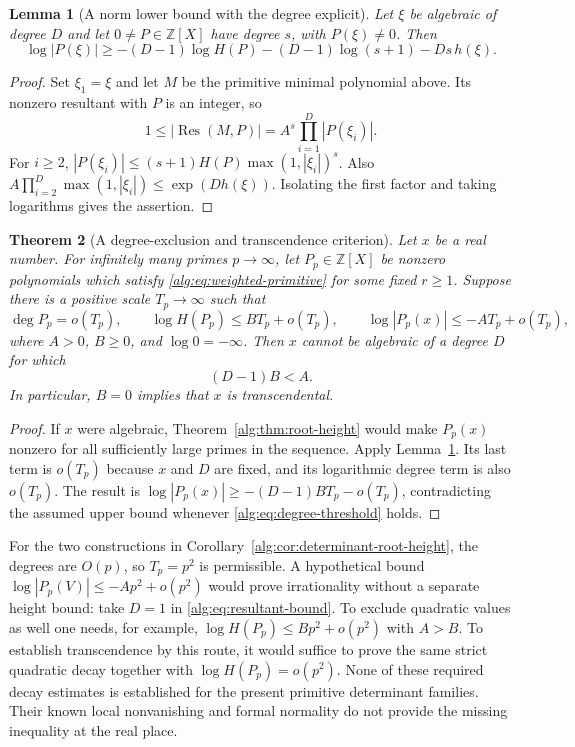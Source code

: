 \documentclass[11pt,a4paper]{article}
\numberwithin{equation}{section}
\newtheorem{theorem}{Theorem}[section]
\newtheorem{lemma}[theorem]{Lemma}
\theoremstyle{definition}\newtheorem{definition}[theorem]{Definition}
\theoremstyle{remark}\newtheorem{remark}[theorem]{Remark}
\begin{document}
\begin{lemma}[A norm lower bound with the degree explicit]
\label{alg:lem:algebraic-evaluation}
Let $\xi$ be algebraic of degree $D$ and let
$0\ne P\in\mathbb Z[X]$ have degree $s$, with $P(\xi)\ne0$. Then
\begin{equation}\label{alg:eq:resultant-bound}
 \log|P(\xi)|\ge -(D-1)\log H(P)
 -(D-1)\log(s+1)-Ds\,h(\xi).
\end{equation}
\end{lemma}
\begin{proof}
Set $\xi_1=\xi$ and let $M$ be the primitive minimal polynomial above.
Its nonzero resultant with $P$ is an integer, so
\[
 1\le |\operatorname{Res}(M,P)|
   =A^s\prod_{i=1}^D|P(\xi_i)|.
\]
For $i\ge2$,
$|P(\xi_i)|\le(s+1)H(P)\max(1,|\xi_i|)^s$.
Also
$A\prod_{i=2}^D\max(1,|\xi_i|)\le\exp(Dh(\xi))$.
Isolating the first factor and taking logarithms gives the assertion.
\end{proof}

\begin{theorem}[A degree-exclusion and transcendence criterion]
\label{alg:thm:degree-exclusion}
Let $x$ be a real number. For infinitely many primes $p\to\infty$, let
$P_p\in\mathbb Z[X]$ be nonzero polynomials which satisfy
\eqref{alg:eq:weighted-primitive} for some fixed $r\ge1$.
Suppose there is a positive scale $T_p\to\infty$ such that
\[
 \deg P_p=o(T_p),\qquad
 \log H(P_p)\le B T_p+o(T_p),\qquad
 \log|P_p(x)|\le-A T_p+o(T_p),
\]
where $A>0$, $B\ge0$, and $\log0=-\infty$.
Then $x$ cannot be algebraic of a degree $D$ for which
\begin{equation}\label{alg:eq:degree-threshold}
 (D-1)B<A.
\end{equation}
In particular, $B=0$ implies that $x$ is transcendental.
\end{theorem}
\begin{proof}
If $x$ were algebraic, Theorem~\ref{alg:thm:root-height} would make $P_p(x)$
nonzero for all sufficiently large primes in the sequence. Apply
Lemma~\ref{alg:lem:algebraic-evaluation}. Its last term is $o(T_p)$ because
$x$ and $D$ are fixed, and its logarithmic degree term is also $o(T_p)$.
The result is
$\log|P_p(x)|\ge-(D-1)BT_p-o(T_p)$, contradicting the assumed upper
bound whenever \eqref{alg:eq:degree-threshold} holds.
\end{proof}

For the two constructions in Corollary~\ref{alg:cor:determinant-root-height},
the degrees are $O(p)$, so $T_p=p^2$ is permissible. A hypothetical bound
$\log|P_p(V)|\le-Ap^2+o(p^2)$ would prove irrationality without a separate
height bound: take $D=1$ in \eqref{alg:eq:resultant-bound}. To exclude quadratic
values as well one needs, for example, $\log H(P_p)\le Bp^2+o(p^2)$ with
$A>B$. To establish transcendence by this route, it would suffice to prove
the same strict quadratic decay together with $\log H(P_p)=o(p^2)$.
None of these required decay estimates is established for the present
primitive determinant families. Their known local nonvanishing and formal
normality do not provide the missing inequality at the real place.
\end{document}
